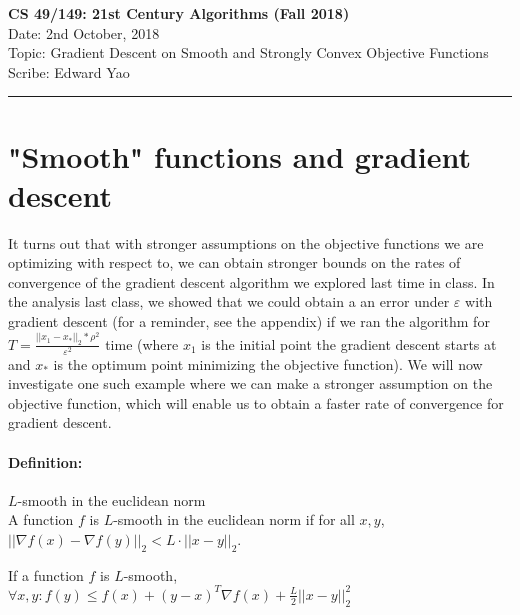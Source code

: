 \documentclass[11pt]{article}
\begin{document}
  \begin{center}
    {\bf \Large CS 49/149: 21st Century Algorithms (Fall 2018)}\\ 
    Date: 2nd October, 2018 \\
    Topic: Gradient Descent on Smooth and Strongly Convex Objective Functions\\
    Scribe: Edward Yao \\
  \end{center}
\hrule height 2pt
\vspace{3ex}
\def\loss{\mathsf{loss}}
\section{"Smooth" functions and gradient descent}

It turns out that with stronger assumptions on the objective functions we are optimizing with respect to, we can obtain stronger bounds on the rates of convergence of the gradient descent algorithm we explored last time in class. In the analysis last class, we showed that we could obtain a an error under $\varepsilon$ with gradient descent (for a reminder, see the appendix) if we ran the algorithm for $T=\frac{||x_1-x_*||_2 * \rho^2}{\varepsilon^2}$ time (where $x_1$ is the initial point the gradient descent starts at and $x_*$ is the optimum point minimizing the objective function). We will now investigate one such example where we can make a stronger assumption on  the objective function, which will enable us to obtain a faster rate of convergence for gradient descent.

\paragraph{Definition:} $L$-smooth in the euclidean norm \\
A function $f$ is $L$-smooth in the euclidean norm if for all $x,y$, $||\nabla f(x)- \nabla f(y) ||_2 < L \cdot ||x - y ||_2$. 

\begin{theorem}
If a function $f$ is $L$-smooth, $\forall x,y: f(y) \leq f(x) + (y-x)^T\nabla f(x) + \frac{L}{2}||x-y||^2_2$
\end{theorem}
\end{document}
